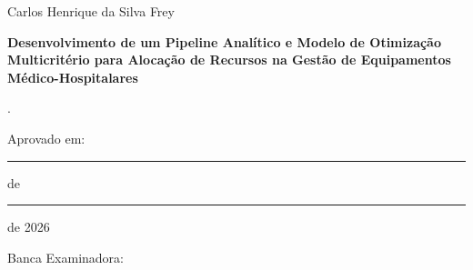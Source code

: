 \addtocounter{page}{+1}
\begin{center}

Carlos Henrique da Silva Frey

\vspace{1cm}

\textbf{Desenvolvimento de um Pipeline Analítico e Modelo de Otimização Multicritério para Alocação de Recursos na Gestão de Equipamentos Médico-Hospitalares}

\end{center}

\vspace{.4cm}

\begin{flushright}
\parbox{8cm}{
.
}
\end{flushright}

\vspace{.6cm}



\noindent Aprovado em: \rule{2cm}{0.4pt} de \rule{4cm}{0.4pt} de 2026

\noindent Banca Examinadora:


%
%
%
%



\vspace{.7cm}

